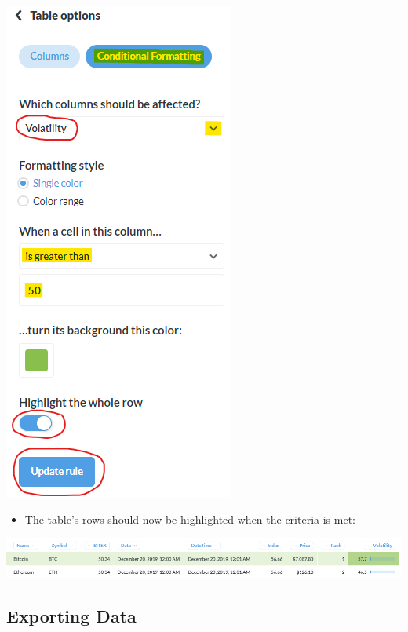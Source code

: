 \documentclass[]{book}
\providecommand{\tightlist}{%
  \setlength{\itemsep}{0pt}\setlength{\parskip}{0pt}}
\begin{document}
\begin{itemize}
\begin{itemize}
\begin{itemize}
      \includegraphics{images/ConditionalFormattingRule.png}

      \begin{itemize}
      \tightlist
      \item
        The table's rows should now be highlighted when the criteria is met:
      \end{itemize}

      \includegraphics{images/ConditionalFormattingOutput.png}
    \end{itemize}
  \end{itemize}
\end{itemize}

\hypertarget{exporting-data}{%
\subsection{Exporting Data}\label{exporting-data}}
\end{document}
